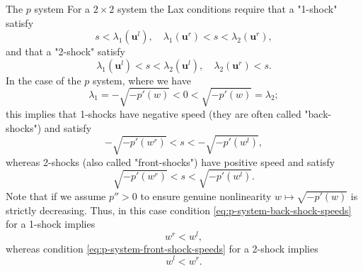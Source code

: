 \begin{Example}{The $p$ system}
\label{ex:p-system-lax-shock}
For a $2\times2$ system the Lax conditions require that a "1-shock" satisfy
\begin{equation}\label{eq:two-system-first-shock-condition}
s<\lambda_1(\bm{u}^l),\quad\lambda_1(\bm{u}^r)<s<\lambda_2(\bm{u}^r),
\end{equation}
and that a "2-shock" satisfy
\begin{equation}\label{eq:two-system-second-shock-condition}
\lambda_1(\bm{u}^l)<s<\lambda_2(\bm{u}^l),\quad\lambda_2(\bm{u}^r)<s.
\end{equation}
In the case of the $p$ system, where we have
\begin{equation}\label{eq:p-system-eigenvalue-signs}
\lambda_1=-\sqrt{-p'(w)}<0<\sqrt{-p'(w)}=\lambda_2;
\end{equation}
this implies that 1-shocks have negative speed (they are often called "back-shocks") and satisfy
\begin{equation}\label{eq:p-system-back-shock-speeds}
-\sqrt{-p'(w^r)}<s<-\sqrt{-p'(w^l)},
\end{equation}
whereas 2-shocks (also called "front-shocks") have positive speed and satisfy
\begin{equation}\label{eq:p-system-front-shock-speeds}
\sqrt{-p'(w^r)}<s<\sqrt{-p'(w^l)}.
\end{equation}
Note that if we assume $p''>0$ to ensure genuine nonlinearity $w\mapsto\sqrt{-p'(w)}$ is strictly decreasing. Thus, in this case condition \eqref{eq:p-system-back-shock-speeds} for a 1-shock implies
\begin{equation}\label{eq:p-system-back-shock-volume-jump}
w^r<w^l,
\end{equation}
whereas condition \eqref{eq:p-system-front-shock-speeds} for a 2-shock implies
\begin{equation}\label{eq:p-system-front-shock-volume-jump}
w^l<w^r.
\end{equation}

\end{Example}
